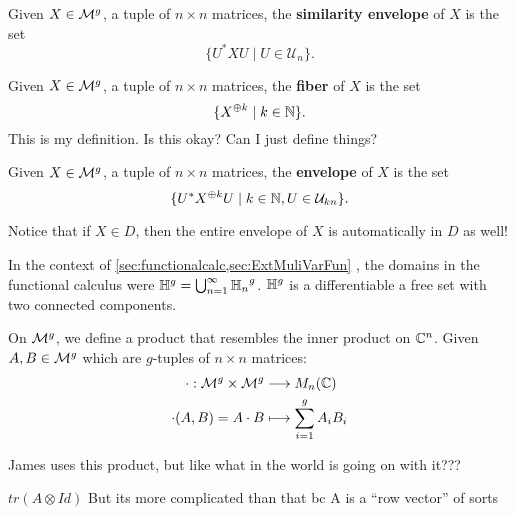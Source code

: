 \begin{definition}
  \label{def:semenv}
  Given \(X \in \mathcal{M}^{g} \), a tuple of \(n \times n\) matrices, the
  \textbf{similarity envelope} of \(X\) is the set
  \[
    \{U^* X U \mid  U \in \mathcal{U}_n\}.
  \]
\end{definition}

\begin{definition}[Fiber]
  \label{def:fiber}
  Given \(X \in \mathcal{M}^{g} \), a tuple of \(n \times n\) matrices, the
  \textbf{fiber} of \(X\) is the set
  \[
    \{X^{\oplus k} \mid  k \in \mathbb{N} \}.
  \]
  {\color{red} This is my definition. Is this okay? Can I just define things?}
\end{definition}

\begin{definition}[Envelope]
  \label{def:env}
  Given \(X \in \mathcal{M}^{g} \), a tuple of \(n \times n\) matrices, the
  \textbf{envelope} of \(X\) is the set
  \[
    \{ U^* X^{\oplus k} U \mid k \in \mathbb{N}, U \in \mathcal{U}_{kn} \}.
  \]
\end{definition}
Notice that if \(X \in D\), then the entire envelope of \(X\) is automatically
in \(D\) as well!

In the context of \cref{sec:functionalcalc,sec:ExtMuliVarFun}
%
, the domains in the functional calculus were
\(\mathbb{H}^g = \bigcup_{n=1}^{\infty} {\mathbb{H}_n}^g\). \(\mathbb{H} ^g\) is a differentiable a
free set with two connected components.

On \(\mathcal{M}^{g} \), we define a product that resembles the inner product on
\(\mathbb{C}^n\). Given \(A,B \in \mathcal{M}^{g} \) which are \(g\)-tuples of \(n \times n\)
matrices:
\begin{align*}
	\cdot : \mathcal{M}^{g} \times \mathcal{M}^{g}  &\longrightarrow M_n(\mathbb{C}) \\
  \cdot (A,B) = A \cdot B &\longmapsto \sum_{i=1}^g A_i B_i
\end{align*}

{\color{red} James uses this product, but like what in the world is going on
  with it???}

{\color{red} \(tr (A \otimes Id)\) But its more complicated than that bc A is a
``row vector'' of sorts}


